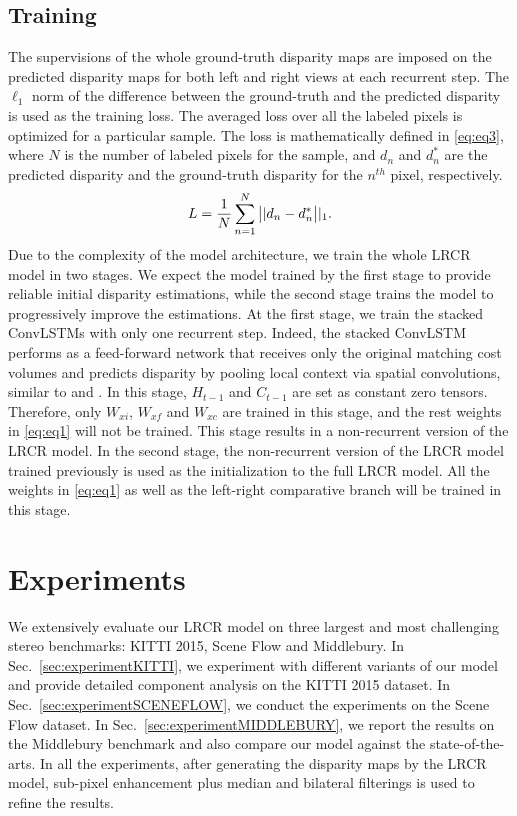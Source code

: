 \documentclass[10pt,twocolumn,letterpaper]{article}
\begin{document}
\subsection{Training}
\label{sec:training}
The supervisions of the whole ground-truth disparity maps are imposed on the predicted disparity maps for both left and right views at each recurrent step. The  $\ell_1$ norm of the difference between the ground-truth and the predicted disparity is used as the training loss. The averaged loss over all the labeled pixels is optimized for a particular sample. The loss is mathematically defined in \eqref{eq:eq3}, where $N$ is the number of labeled pixels for the sample, and $d_{n}$ and $d_{n}^{*}$ are the predicted disparity and the ground-truth disparity for the $n^{th}$ pixel, respectively.
\begin{equation}
\vspace{-0.1cm}
L = \frac{1}{N}\sum_{n=1}^{N}\big||d_{n}-d_{n}^{*}\big||_{1}.
\label{eq:eq3}
\vspace{-0.2cm}
\end{equation}
Due to the complexity of the model architecture, we train the whole LRCR model in two stages. We expect the model trained by the first stage to provide reliable initial disparity estimations, while the second stage trains the model to progressively improve the estimations. At the first stage, we  train the stacked ConvLSTMs with only one recurrent step. Indeed, the stacked ConvLSTM performs as a feed-forward network that receives only the original matching cost volumes and predicts disparity by pooling local context via spatial convolutions, similar to \cite{kendall2017end} and \cite{zhong2017self}. In this stage, $H_{t-1}$ and $C_{t-1}$ are set as  constant zero tensors. Therefore, only $W_{xi}$, $W_{xf}$ and $W_{xc}$ are trained in this stage, and the rest weights in \eqref{eq:eq1} will not be trained. This stage results in a non-recurrent version of the LRCR model. In the second stage, the non-recurrent version of the LRCR model trained previously is used as the initialization to the full LRCR model. All the weights in \eqref{eq:eq1} as well as the left-right comparative branch will be trained in this stage.



 \section{Experiments}
 We extensively evaluate our LRCR model  on three largest and   most challenging stereo benchmarks: KITTI 2015, Scene Flow and Middlebury. In Sec.~\ref{sec:experimentKITTI}, we experiment with different variants of our model and provide detailed component analysis on the KITTI 2015 dataset. In Sec.~\ref{sec:experimentSCENEFLOW}, we conduct the experiments on the Scene Flow dataset. In Sec.~\ref{sec:experimentMIDDLEBURY}, we report the results on the Middlebury benchmark and also compare our model against the  state-of-the-arts. In all the experiments, after generating the disparity maps by the LRCR model, sub-pixel enhancement plus median and bilateral filterings is used to refine the results.
 
\end{document}
